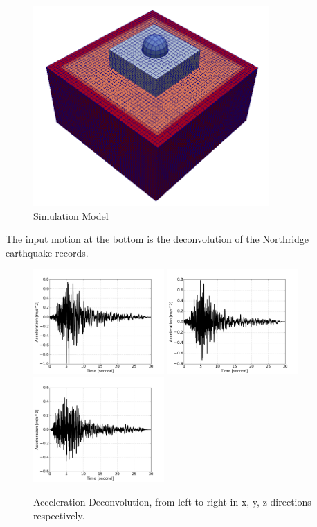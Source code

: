 \begin{figure}[H]
  \centering
  \includegraphics[width = 9cm]{./Figure-files/Day1/Nuclear_Power_Plant_with_3by1D_motions_from_Deconvolution/overview.png}
  \caption{Simulation Model}
  \label{fig_NPP_3D_overview_3by1Dmotion}
\end{figure}


The input motion at the bottom is the deconvolution of the Northridge earthquake records. 

\begin{figure}[H]
  \centering
  \includegraphics[width = 5cm]{./Figure-files/Day1/Nuclear_Power_Plant_with_3by1D_motions_from_Deconvolution/scaled_NORTHR_x_A.jpg}
  \includegraphics[width = 5cm]{./Figure-files/Day1/Nuclear_Power_Plant_with_3by1D_motions_from_Deconvolution/scaled_NORTHR_y_A.jpg}
  \includegraphics[width = 5cm]{./Figure-files/Day1/Nuclear_Power_Plant_with_3by1D_motions_from_Deconvolution/scaled_NORTHR_z_A.jpg}
  \caption{Acceleration Deconvolution, from left to right in x, y, z directions respectively. }
  \label{fig_motion_deconvolution2}
\end{figure}

